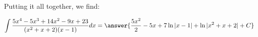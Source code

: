 \documentclass{ximera}
\begin{document}
\begin{exercise}
\begin{exercise}
\begin{exercise}
\begin{exercise}
\begin{exercise}
\begin{exercise}
Putting it all together, we find:

\[
\int \frac{5x^{4}-5x^{3}+14x^{2}-9x+23}{(x^{2}+x+2)(x-1)} dx= \answer{ \frac{5x^{2}}{2} - 5x+7\ln|x-1|+ \ln| x^{2}+x+2 | + C}
\]


\end{exercise}
\end{exercise}
\end{exercise}
\end{exercise}
\end{exercise}
\end{exercise}
\end{document}
